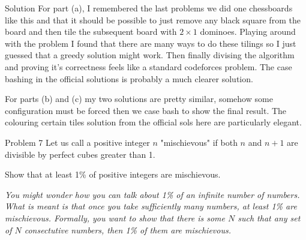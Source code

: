 \documentclass{article}
\begin{document}
\begin{solution}{Solution}
For part (a), I remembered the last problems we did one chessboards like
this and that it should be possible to just remove any black square from
the board and then tile the subsequent board with $2\times 1$ dominoes.
Playing around with the problem I found that there are many ways to do these
tilings so I just guessed that a greedy solution might work. Then finally
divising the algorithm and proving it's correctness feels like a standard
codeforces problem. The case bashing in the official solutions is probably
a much clearer solution. \vspace{0.2cm}

For parts (b) and (c) my two solutions are pretty similar, somehow some
configuration must be forced then we case bash to show the final result.
The colouring certain tiles solution from the official sols here are
particularly elegant.
\end{solution}
\newpage

\begin{problem}{Problem 7}
Let us call a positive integer $n$ "mischievous" if both $n$ and $n+1$ are
divisible by perfect cubes greater than 1. \vspace{0.2cm}

Show that at least 1\% of positive integers are mischievous.
\vspace{0.2cm}

\textit{
You might wonder how you can talk about 1\% of an infinite number of
numbers. What is meant is that once you take sufficiently many numbers,
at least 1\% are mischievous. Formally, you want to show that there is
some $N$ such that any set of $N$ consectutive numbers, then 1\% of
them are mischievous.
}
\end{problem}
\end{document}
